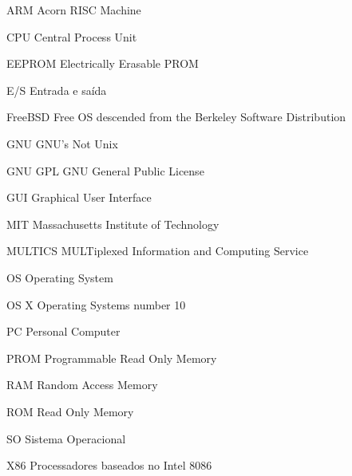 \begin{siglas}
    \item[ARM] Acorn RISC Machine
    \item[CPU] Central Process Unit
    \item[EEPROM] Electrically Erasable PROM 
    \item[E/S] Entrada e saída
    \item[FreeBSD] Free OS descended from the 
    Berkeley Software Distribution 
    \item[GNU] GNU's Not Unix
    \item[GNU GPL] GNU General Public License
    \item[GUI] Graphical User Interface
    \item[MIT] Massachusetts Institute of Technology
    \item[MULTICS] MULTiplexed Information and Computing Service 
    \item[OS] Operating System  
    \item[OS X] Operating Systems number 10 
    \item[PC] Personal Computer
    \item[PROM] Programmable Read Only Memory
    \item[RAM] Random Access Memory
    \item[ROM] Read Only Memory 
    \item[SO] Sistema Operacional
    \item[X86] Processadores baseados no Intel 8086
\end{siglas}